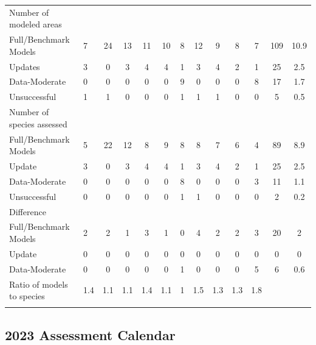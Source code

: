 \documentclass[11pt,
  english,
  a4paper,
]{article}
\begin{document}
\begin{landscape}
\begin{longtable}[t]{>{\raggedright\arraybackslash}p{6cm}lccccccccccc}
\endfoot
\bottomrule
\endlastfoot
Number of modeled areas &  &  &  &  &  &  &  &  &  &  &  & \\
\hspace{3mm}Full/Benchmark Models & 7 & 24 & 13 & 11 & 10 & 8 & 12 & 9 & 8 & 7 & 109 & 10.9\\
\hspace{3mm}Updates & 3 & 0 & 3 & 4 & 4 & 1 & 3 & 4 & 2 & 1 & 25 & 2.5\\
\hspace{3mm}Data-Moderate & 0 & 0 & 0 & 0 & 0 & 9 & 0 & 0 & 0 & 8 & 17 & 1.7\\
\hspace{3mm}Unsuccessful & 1 & 1 & 0 & 0 & 0 & 1 & 1 & 1 & 0 & 0 & 5 & 0.5\\
Number of species assessed &  &  &  &  &  &  &  &  &  &  &  & \\
\hspace{3mm}Full/Benchmark Models & 5 & 22 & 12 & 8 & 9 & 8 & 8 & 7 & 6 & 4 & 89 & 8.9\\
\hspace{3mm}Update & 3 & 0 & 3 & 4 & 4 & 1 & 3 & 4 & 2 & 1 & 25 & 2.5\\
\hspace{3mm}Data-Moderate & 0 & 0 & 0 & 0 & 0 & 8 & 0 & 0 & 0 & 3 & 11 & 1.1\\
\hspace{3mm}Unsuccessful & 0 & 0 & 0 & 0 & 0 & 1 & 1 & 0 & 0 & 0 & 2 & 0.2\\
Difference &  &  &  &  &  &  &  &  &  &  &  & \\
\hspace{3mm}Full/Benchmark Models & 2 & 2 & 1 & 3 & 1 & 0 & 4 & 2 & 2 & 3 & 20 & 2\\
\hspace{3mm}Update & 0 & 0 & 0 & 0 & 0 & 0 & 0 & 0 & 0 & 0 & 0 & 0\\
\hspace{3mm}Data-Moderate & 0 & 0 & 0 & 0 & 0 & 1 & 0 & 0 & 0 & 5 & 6 & 0.6\\
Ratio of models to species & 1.4 & 1.1 & 1.1 & 1.4 & 1.1 & 1 & 1.5 & 1.3 & 1.3 & 1.8 &  & \\*
\end{longtable}
\leavevmode\tagmcend\tagstructend\par
\endgroup{}
\end{landscape}
\endgroup{}


\hypertarget{assessment-calendar}{%
\subsection{2023 Assessment Calendar}\label{assessment-calendar}}
\end{document}
